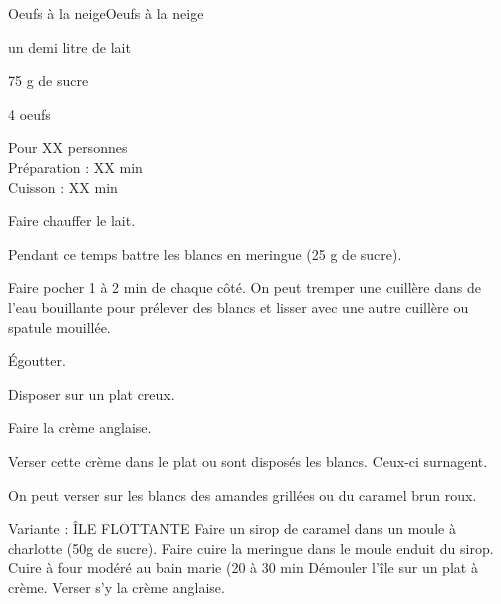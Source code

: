 \begin{recette}{Oeufs à la neige}{Oeufs à la neige}

\begin{ingredients}
un demi litre de lait\par
75 g de sucre\par
4 oeufs\par
\end{ingredients}

\begin{infos}
Pour XX personnes\\
Préparation : XX min\\
Cuisson : XX min\\
\end{infos}

\begin{etapes}
\item Faire chauffer le lait.
\item Pendant ce temps battre les blancs en meringue (25 g de sucre).
\item Faire pocher 1 à 2 min de chaque côté. On peut tremper une cuillère dans de l'eau bouillante pour prélever des blancs et lisser avec une autre cuillère ou spatule mouillée.
\item Égoutter.
\item Disposer sur un plat creux.
\item Faire la crème anglaise.
\item Verser cette crème dans le plat ou sont disposés les blancs. Ceux-ci surnagent.
\item On peut verser sur les blancs des amandes grillées ou du caramel brun roux.
\end{etapes}

\begin{conseils}
Variante : ÎLE FLOTTANTE
Faire un sirop de caramel dans un moule à charlotte (50g de sucre).
Faire cuire la meringue dans le moule enduit du sirop.
Cuire à four modéré au bain marie (20 à 30 min
Démouler l’île sur un plat à crème.
Verser s’y la crème anglaise.
\end{conseils}

\end{recette}
